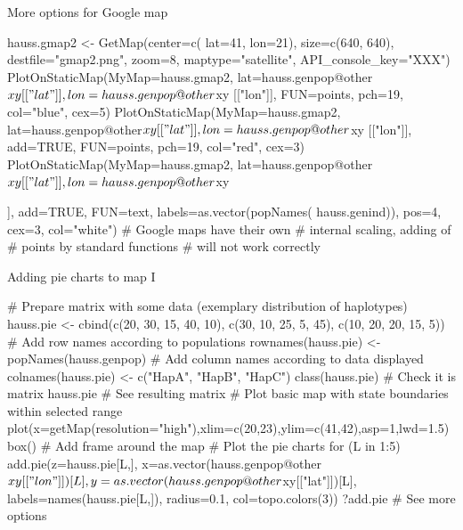 \documentclass[compress, ucs, xelatex, 11pt, xcolor=svgnames, aspectratio=169,
	hyperref={
		bookmarks=true,
		unicode=true,
		colorlinks=true,
		pdftitle={Molecular data in R},
		plainpages=false,
		pdfauthor={Vojtech Zeisek},
		pdfsubject={Course about phylogeny and evolution in R},
		pdfcreator={XeLaTeX},
		pdfkeywords={R, evolution, phylogeny, molecular data},
		linkcolor=Crimson, %
		anchorcolor=Magenta, %
		citecolor=Magenta, %
		filecolor=Magenta, %
		menucolor=Magenta, %
		urlcolor=DodgerBlue, %
		pdftex},
	url={hyphens, lowtilde} %
	]{beamer}
\renewcommand{\texttt}[1]{\colorbox{Beige}{{\ttfamily #1}}}
\begin{document}
\begin{frame}[fragile]{More options for Google map}
	\begin{multicols}{2}
		\begin{spluscode}
    hauss.gmap2 <- GetMap(center=c(
      lat=41, lon=21), size=c(640,
      640), destfile="gmap2.png",
      zoom=8, maptype="satellite",
      API_console_key="XXX")
    PlotOnStaticMap(MyMap=hauss.gmap2,
      lat=hauss.genpop@other$xy[["lat"
      ]], lon=hauss.genpop@other$xy
      [["lon"]], FUN=points, pch=19,
      col="blue", cex=5)
    PlotOnStaticMap(MyMap=hauss.gmap2,
      lat=hauss.genpop@other$xy[["lat"
      ]], lon=hauss.genpop@other$xy
      [["lon"]], add=TRUE, FUN=points,
      pch=19, col="red", cex=3)
    PlotOnStaticMap(MyMap=hauss.gmap2,
      lat=hauss.genpop@other$xy[["lat"
      ]], lon=hauss.genpop@other$xy
		\end{spluscode}
		\begin{spluscode}
      [["lon"]], add=TRUE, FUN=text,
      labels=as.vector(popNames(
      hauss.genind)), pos=4, cex=3,
      col="white")
    # Google maps have their own
    # internal scaling, adding of
    # points by standard functions
    # will not work correctly
		\end{spluscode}
		\begin{center}
			\texttt{[image: gmap2.jpg]}
		\end{center}
	\end{multicols}
\end{frame}

\begin{frame}[fragile]{Adding pie charts to map I}
	\begin{spluscode}
    # Prepare matrix with some data (exemplary distribution of haplotypes)
    hauss.pie <- cbind(c(20, 30, 15, 40, 10), c(30, 10, 25, 5, 45),
      c(10, 20, 20, 15, 5))
    # Add row names according to populations
    rownames(hauss.pie) <- popNames(hauss.genpop)
    # Add column names according to data displayed
    colnames(hauss.pie) <- c("HapA", "HapB", "HapC")
    class(hauss.pie) # Check it is matrix
    hauss.pie # See resulting matrix
    # Plot basic map with state boundaries within selected range
    plot(x=getMap(resolution="high"),xlim=c(20,23),ylim=c(41,42),asp=1,lwd=1.5)
    box() # Add frame around the map
    # Plot the pie charts
    for (L in 1:5) { add.pie(z=hauss.pie[L,], x=as.vector(hauss.genpop@other
      $xy[["lon"]])[L], y=as.vector(hauss.genpop@other$xy[["lat"]])[L],
      labels=names(hauss.pie[L,]), radius=0.1, col=topo.colors(3)) }
    ?add.pie # See more options
	\end{spluscode}
\end{frame}
\end{document}
